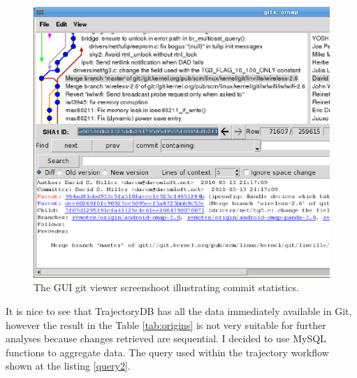 \documentclass[a4paper,10pt]{article}
\numberwithin{equation}{subsection}
\begin{document}
\begin{figure}[h]
   \centering
   \includegraphics[width=\textwidth]{figures/Screenshot-gitk:omap.ps}
   \caption{The GUI git viewer screenshoot illustrating commit statistics.}
   \label{fig:git_screen}
\end{figure}

It is nice to see that TrajectoryDB has all the data immediately available in Git, however the result in the Table 
\ref{tab:origins} is not very suitable for further analyses because changes retrieved are sequential. I decided to
use MySQL functions to aggregate data. The query used within the trajectory workflow shown at the listing 
\ref{query2}.
\end{document}
